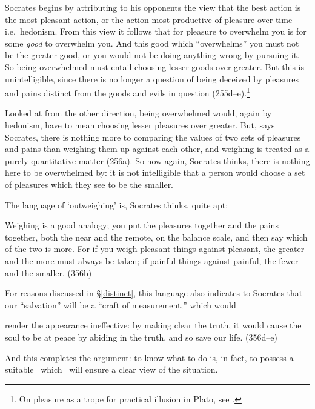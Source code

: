 \documentclass[11pt,letterpaper,oneside]{amsart} %
\begin{document}
Socrates begins by attributing to his opponents the view that the best action is the most pleasant action, or the action most productive of pleasure over time---i.e.\ hedonism. From this view it follows that for pleasure to overwhelm you is for some \emph{good} to overwhelm you. And this good which ``overwhelms'' you must not be the greater good, or you would not be doing anything wrong by pursuing it. So being overwhelmed must entail choosing lesser goods over greater. But this is unintelligible, since there is no longer a question of being deceived by pleasures and pains distinct from the goods and evils in question (255d--e).\footnote{On pleasure as a trope for practical illusion in Plato, see \citet{moss2006pai}.}


Looked at from the other direction, being overwhelmed would, again by hedonism, have to mean choosing lesser pleasures over greater. But, says Socrates, there is nothing more to comparing the values of two sets of pleasures and pains than weighing them up against each other, and weighing is treated as a purely quantitative matter (256a). So now again, Socrates thinks, there is nothing here to be overwhelmed by: it is not intelligible that a person would choose a set of pleasures which they see to be the smaller.%

The language of `outweighing' is, Socrates thinks, quite apt:\begin{squote}Weighing is a good analogy; you put the pleasures together and the pains together, both the near and the remote, on the balance scale, and then say which of the two is more. For if you weigh pleasant things against pleasant, the greater and the more must always be taken; if painful things against painful, the fewer and the smaller. (356b)\end{squote}For reasons discussed in \S\ref{distinct}, this language also indicates to Socrates that our ``salvation'' will be a ``craft of measurement,'' which would \begin{squote} render the appearance ineffective: by making clear the truth, it would cause the soul to be at peace by abiding in the truth, and so save our life. (356d--e)\end{squote} And this completes the argument: to know what to do is, in fact, to possess a suitable \techne\, which \techne\ will ensure a clear view of the situation.%
\end{document}
